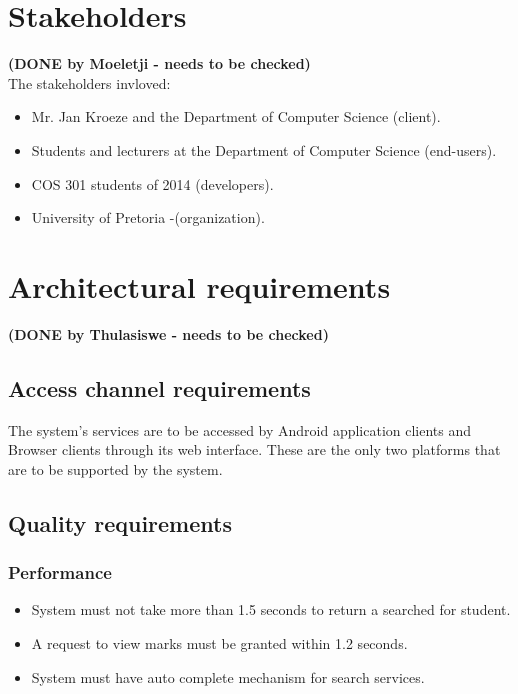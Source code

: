 \documentclass[11pt,a4paper]{article}
\begin{document}
\section{Stakeholders}
\textbf{(DONE by Moeletji - needs to be checked)}\\
The stakeholders invloved: 
\begin{itemize}
\item Mr. Jan Kroeze and the Department of Computer Science (client). 
\item Students and lecturers at the Department of Computer Science (end-users).
\item COS 301 students of 2014 (developers).
\item University of Pretoria -(organization). 
\end{itemize}

\section{Architectural requirements}
\textbf{(DONE by Thulasiswe - needs to be checked)}\\

\subsection{Access channel requirements}
The system's services are to be accessed by Android application clients and Browser clients through its web interface. These are the only two platforms that are to be supported by the system.

\subsection{Quality requirements}
\subsubsection{Performance}
	\begin{itemize}
		\item System must not take more than 1.5 seconds to return a searched for student.
		\item A request to view marks must be granted within 1.2 seconds.
		\item System must have auto complete mechanism for search services.
	\end{itemize}
\end{document}
